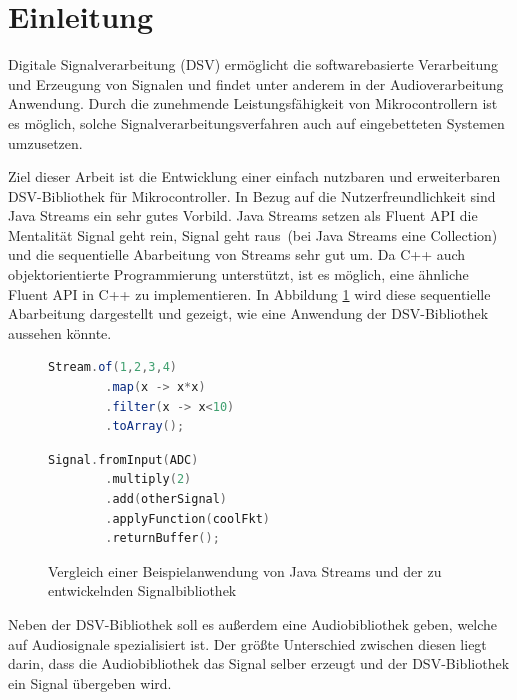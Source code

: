 \section{Einleitung}

Digitale Signalverarbeitung (DSV) ermöglicht die softwarebasierte Verarbeitung
und Erzeugung von Signalen und findet unter anderem in der Audioverarbeitung 
Anwendung. Durch die zunehmende Leistungsfähigkeit von Mikrocontrollern ist
es möglich, solche Signalverarbeitungsverfahren auch auf eingebetteten Systemen 
umzusetzen. 

Ziel dieser Arbeit ist die Entwicklung einer einfach nutzbaren und erweiterbaren
DSV-Bibliothek für Mikrocontroller. In Bezug auf die
Nutzerfreundlichkeit sind Java Streams \cite{java2026stream} ein
sehr gutes Vorbild. Java Streams setzen als Fluent API \cite{fluentAPI} die Mentalität
\glqq Signal geht rein, Signal geht raus\grqq\ (bei Java Streams eine
Collection) und die sequentielle Abarbeitung von Streams sehr gut um.
Da C++ auch objektorientierte Programmierung unterstützt, ist es möglich, eine
ähnliche Fluent API in C++ zu implementieren. 
In Abbildung \ref{Vergleich_Streams_Signal} wird diese sequentielle
Abarbeitung dargestellt und gezeigt, wie eine Anwendung der DSV-Bibliothek
aussehen könnte.

\begin{figure}[h]
  
  \begin{minipage}[h]{0.48\textwidth}
    \begin{lstlisting}[language=Java, 
      frame=single,
      captionpos=b]
      Stream.of(1,2,3,4)
        .map(x -> x*x)
        .filter(x -> x<10)
        .toArray();
    \end{lstlisting}
  \end{minipage}
  \hfill
  \begin{minipage}[h]{0.48\textwidth}
    \begin{lstlisting}[language=C++, 
      frame=single,
      captionpos=b]
      Signal.fromInput(ADC)
        .multiply(2)
        .add(otherSignal)
        .applyFunction(coolFkt)
        .returnBuffer();
    \end{lstlisting}
  \end{minipage}
  \caption{Vergleich einer Beispielanwendung von Java Streams und
            der zu entwickelnden Signalbibliothek}
  \label{Vergleich_Streams_Signal}
\end{figure}



Neben der DSV-Bibliothek soll es außerdem eine Audiobibliothek geben, welche
auf Audiosignale spezialisiert ist. Der größte Unterschied
zwischen diesen liegt darin, dass die Audiobibliothek das Signal selber erzeugt
und der DSV-Bibliothek ein Signal übergeben wird.

